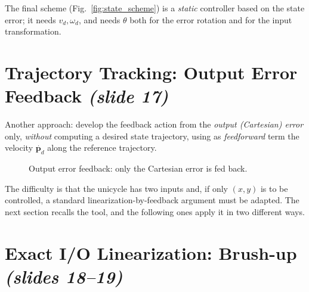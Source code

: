 \documentclass[11pt,a4paper]{article}
\newcommand{\vect}[1]{\bm{#1}}
\newcommand{\vd}{v_d}
\newcommand{\omd}{\omega_d}
\newcommand{\pd}{\vect{p}_d}
\theoremstyle{plain}
\theoremstyle{definition}
\theoremstyle{remark}
\begin{document}
The final scheme (Fig.~\ref{fig:state_scheme}) is a \emph{static} controller based on the state error; it needs $\vd,\omd$, and needs $\theta$ both for the error rotation and for the input transformation.

\section{Trajectory Tracking: Output Error Feedback \emph{(slide 17)}}

Another approach: develop the feedback action from the \emph{output (Cartesian) error} only, \emph{without} computing a desired state trajectory, using as \emph{feedforward} term the velocity $\dot{\pd}$ along the reference trajectory.

\begin{figure}[H]
\centering
{}
\caption{Output error feedback: only the Cartesian error is fed back.}
\end{figure}

The difficulty is that the unicycle has two inputs and, if only $(x,y)$ is to be controlled, a standard linearization-by-feedback argument must be adapted. The next section recalls the tool, and the following ones apply it in two different ways.

\section{Exact I/O Linearization: Brush-up \texorpdfstring{\emph{(slides 18--19)}}{(slides 18--19)}}
\end{document}
